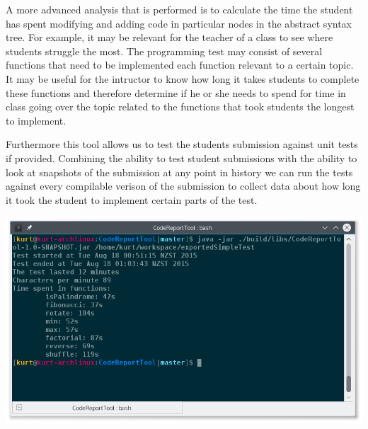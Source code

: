 \documentclass[a1,portrait]{a0poster}
\begin{document}
\begin{multicols}{2}
A more advanced analysis that is performed is to calculate the time the student
has spent modifying and adding code in particular nodes in the abstract syntax
tree. For example, it may be relevant for the teacher of a class to see where
students struggle the most. The programming test may consist of several
functions that need to be implemented each function relevant to a certain
topic. It may be useful for the intructor to know how long it takes students to
complete these functions and therefore determine if he or she needs to spend
for time in class going over the topic related to the functions that took
students the longest to implement.

Furthermore this tool allows us to test the students submission against unit
tests if provided. Combining the ability to test student submissions with the
ability to look at snapshots of the submission at any point in history we can
run the tests against every compilable verison of the submission to collect
data about how long it took the student to implement certain parts of the test.

\begin{center}\vspace{1cm}
\includegraphics[width=0.8\linewidth]{CodeReportTool}
\end{center}\vspace{1cm}

{\small
}

\end{multicols}
\end{document}
